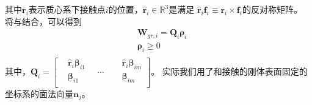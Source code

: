 其中${\boldsymbol{r}_{i}}$表示质心系下接触点$i$的位置，${{\hat{\boldsymbol{r}}}_{i}}\in {{\mathbb{R}}^{3}}$是满足
${{\hat{\boldsymbol{r}}}_{i}}{\boldsymbol{f}_{i}}\equiv {\boldsymbol{r}_{i}}\times {\boldsymbol{f}_{i}}$的反对称矩阵。
将与结合，可以得到
\begin{equation}
    \label{equ:wrench_matrix}
    \begin{aligned}
        & {{\boldsymbol{W}}_{gr,i}}={{\boldsymbol{Q}}_{i}}{{\boldsymbol{\rho}}_{i}} \\ 
       & {{\boldsymbol{\rho}}_{i}}\ge 0 \\ 
      \end{aligned}        
\end{equation}
其中，${{\boldsymbol{Q}}_{i}}=\left[ \begin{aligned}
    & {{{\hat{\boldsymbol{r}}}}_{i}}{{\boldsymbol{\beta}}_{i1}} \\ 
   & {{\boldsymbol{\beta}}_{i1}}\ \ \ \  \\ 
  \end{aligned} \right.\ \ \ \ \cdots \ \ \ \ \left. \begin{aligned}
    & {{{\hat{\boldsymbol{r}}}}_{i}}{{\boldsymbol{\beta}}_{im}} \\ 
   & {{\boldsymbol{\beta}}_{im}} \\ 
  \end{aligned} \right]
  $。
  实际我们用了和接触的刚体表面固定的坐标系的面法向量${{\boldsymbol{n}}_{j}}$。
